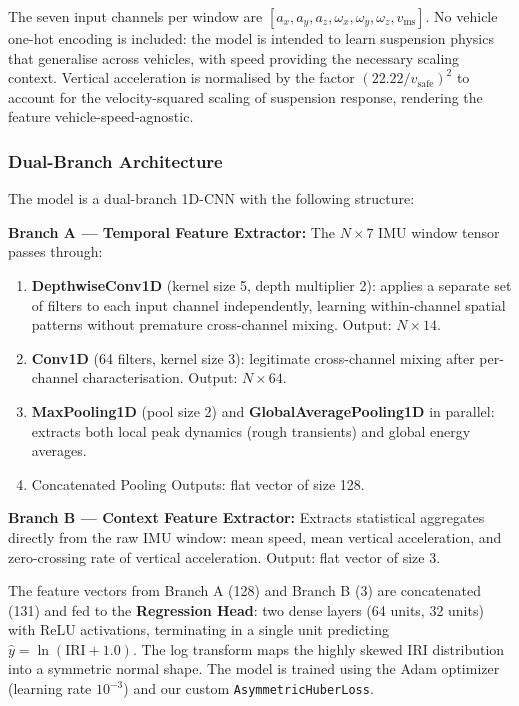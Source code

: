 \documentclass[conference]{IEEEtran}
\begin{document}
The seven input channels per window are $[a_x, a_y, a_z, \omega_x, \omega_y, \omega_z, v_{\text{ms}}]$.
No vehicle one-hot encoding is included: the model is intended to learn suspension physics that generalise across vehicles, with speed providing the necessary scaling context.
Vertical acceleration is normalised by the factor $(22.22 / v_{\text{safe}})^2$ to account for the velocity-squared scaling of suspension response, rendering the feature vehicle-speed-agnostic.

\subsubsection{Dual-Branch Architecture}

The model is a dual-branch 1D-CNN with the following structure:

\textbf{Branch A --- Temporal Feature Extractor:} The $N \times 7$ IMU window tensor passes through:
\begin{enumerate}
    \item \textbf{DepthwiseConv1D} (kernel size 5, depth multiplier 2): applies a separate set of filters to each input channel independently, learning within-channel spatial patterns without premature cross-channel mixing.
Output: $N \times 14$.
    \item \textbf{Conv1D} (64 filters, kernel size 3): legitimate cross-channel mixing after per-channel characterisation.
Output: $N \times 64$.
    \item \textbf{MaxPooling1D} (pool size 2) and \textbf{GlobalAveragePooling1D} in parallel: extracts both local peak dynamics (rough transients) and global energy averages.
    \item Concatenated Pooling Outputs: flat vector of size 128.
\end{enumerate}

\textbf{Branch B --- Context Feature Extractor:} Extracts statistical aggregates directly from the raw IMU window: mean speed, mean vertical acceleration, and zero-crossing rate of vertical acceleration.
Output: flat vector of size 3.

The feature vectors from Branch A (128) and Branch B (3) are concatenated (131) and fed to the \textbf{Regression Head}: two dense layers (64 units, 32 units) with ReLU activations, terminating in a single unit predicting $\hat{y} = \ln(\text{IRI} + 1.0)$.
The log transform maps the highly skewed IRI distribution into a symmetric normal shape.
The model is trained using the Adam optimizer (learning rate $10^{-3}$) and our custom \texttt{AsymmetricHuberLoss}.
\end{document}
